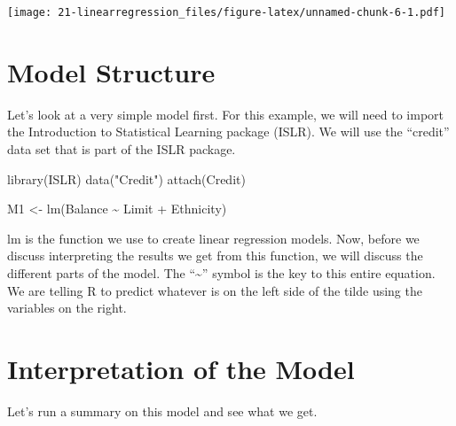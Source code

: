 \documentclass[
]{book}
\newenvironment{Shaded}{\begin{snugshade}}{\end{snugshade}}
\newcommand{\FunctionTok}[1]{\textcolor[rgb]{0.00,0.00,0.00}{#1}}
\newcommand{\NormalTok}[1]{#1}
\newcommand{\OtherTok}[1]{\textcolor[rgb]{0.56,0.35,0.01}{#1}}
\newcommand{\SpecialCharTok}[1]{\textcolor[rgb]{0.00,0.00,0.00}{#1}}
\newcommand{\StringTok}[1]{\textcolor[rgb]{0.31,0.60,0.02}{#1}}
\begin{document}
\texttt{[image: 21-linearregression\_files/figure-latex/unnamed-chunk-6-1.pdf]}

\hypertarget{model-structure}{%
\section{Model Structure}\label{model-structure}}

Let's look at a very simple model first. For this example, we will need to import the Introduction to Statistical Learning package (ISLR). We will use the ``credit'' data set that is part of the ISLR package.

\begin{Shaded}
\begin{Highlighting}[]
\FunctionTok{library}\NormalTok{(ISLR)}
\FunctionTok{data}\NormalTok{(}\StringTok{"Credit"}\NormalTok{)}
\FunctionTok{attach}\NormalTok{(Credit)}

\NormalTok{M1 }\OtherTok{\textless{}{-}} \FunctionTok{lm}\NormalTok{(Balance }\SpecialCharTok{\textasciitilde{}}\NormalTok{ Limit }\SpecialCharTok{+}\NormalTok{ Ethnicity)}
\end{Highlighting}
\end{Shaded}

lm is the function we use to create linear regression models. Now, before we discuss interpreting the results we get from this function, we will discuss the different parts of the model. The ``\textasciitilde{}'' symbol is the key to this entire equation. We are telling R to predict whatever is on the left side of the tilde using the variables on the right.

\hypertarget{interpretation-of-the-model}{%
\section{Interpretation of the Model}\label{interpretation-of-the-model}}

Let's run a summary on this model and see what we get.
\end{document}
